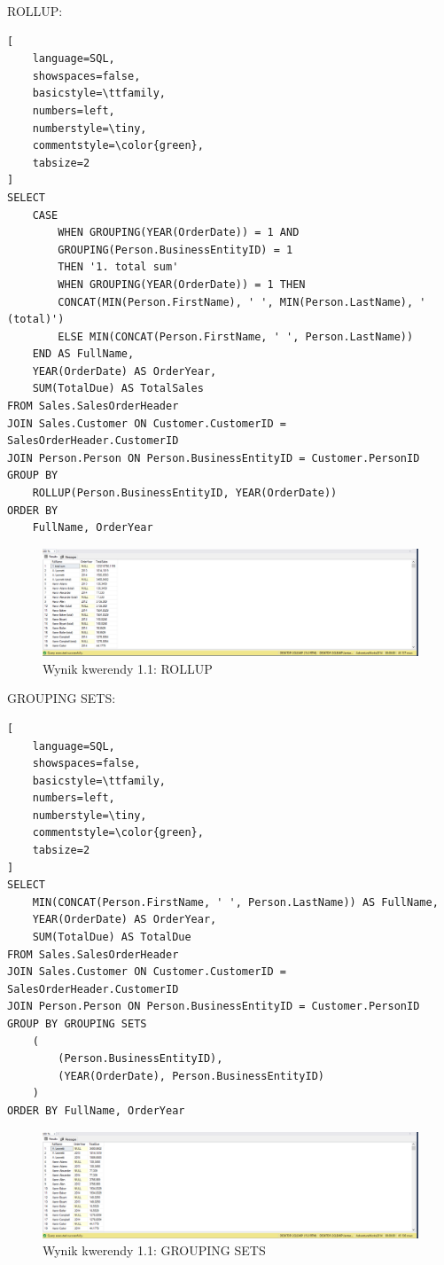 \documentclass[a4paper,12pt]{article}
\begin{document}
ROLLUP:

{\small
\begin{lstlisting}[
	language=SQL,
	showspaces=false,
	basicstyle=\ttfamily,
	numbers=left,
	numberstyle=\tiny,
	commentstyle=\color{green},
	tabsize=2
]
SELECT
    CASE 
        WHEN GROUPING(YEAR(OrderDate)) = 1 AND 
        GROUPING(Person.BusinessEntityID) = 1 
        THEN '1. total sum'
        WHEN GROUPING(YEAR(OrderDate)) = 1 THEN 
        CONCAT(MIN(Person.FirstName), ' ', MIN(Person.LastName), ' (total)')
        ELSE MIN(CONCAT(Person.FirstName, ' ', Person.LastName))
    END AS FullName,
    YEAR(OrderDate) AS OrderYear,
    SUM(TotalDue) AS TotalSales
FROM Sales.SalesOrderHeader
JOIN Sales.Customer ON Customer.CustomerID = SalesOrderHeader.CustomerID
JOIN Person.Person ON Person.BusinessEntityID = Customer.PersonID
GROUP BY 
    ROLLUP(Person.BusinessEntityID, YEAR(OrderDate))
ORDER BY 
    FullName, OrderYear
\end{lstlisting}}

\begin{figure}[H]
  \centering
  \includegraphics[width=1.0\textwidth]{images/1.1_rollup.png}
  \caption{Wynik kwerendy 1.1: ROLLUP}
\end{figure}

GROUPING SETS:

{\small
\begin{lstlisting}[
	language=SQL,
	showspaces=false,
	basicstyle=\ttfamily,
	numbers=left,
	numberstyle=\tiny,
	commentstyle=\color{green},
	tabsize=2
]
SELECT
    MIN(CONCAT(Person.FirstName, ' ', Person.LastName)) AS FullName,	
    YEAR(OrderDate) AS OrderYear,
    SUM(TotalDue) AS TotalDue
FROM Sales.SalesOrderHeader
JOIN Sales.Customer ON Customer.CustomerID = SalesOrderHeader.CustomerID
JOIN Person.Person ON Person.BusinessEntityID = Customer.PersonID
GROUP BY GROUPING SETS
    (
		(Person.BusinessEntityID),
        (YEAR(OrderDate), Person.BusinessEntityID)
    )
ORDER BY FullName, OrderYear
\end{lstlisting}}

\begin{figure}[H]
  \centering
  \includegraphics[width=1.0\textwidth]{images/1.1_grouping.png}
  \caption{Wynik kwerendy 1.1: GROUPING SETS}
\end{figure}
\end{document}
